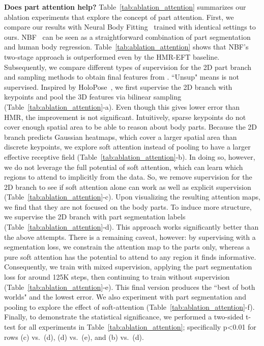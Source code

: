 \documentclass[10pt,twocolumn,letterpaper,usenames,dvipsnames]{article}
\begin{document}
\noindent\textbf{Does part attention help?}
Table~\ref{tab:ablation_attention} summarizes our ablation experiments that explore the concept of part attention. First, we compare our results with Neural Body Fitting~\cite{omran2018nbf} trained with identical settings to ours. NBF~\cite{omran2018nbf} can be seen as a straightforward combination of part segmentation and human body regression. Table~\ref{tab:ablation_attention} shows that NBF's two-stage approach is outperformed even by the HMR-EFT baseline. Subsequently, we compare different types of supervision for the 2D part branch  and sampling methods to obtain final features  from . ``Unsup" means  is not supervised.
Inspired by HoloPose~\cite{guler_2019_CVPR}, we first supervise the 2D branch with keypoints and pool the 3D features via bilinear sampling (Table~\ref{tab:ablation_attention}-a). 
Even though this gives lower error than HMR, the improvement is not significant. 
Intuitively, sparse keypoints do not cover enough spatial area to be able to reason about body parts. 
Because the 2D branch predicts Gaussian heatmaps, which cover a larger spatial area than discrete keypoints, we 
explore soft attention instead of pooling to have a larger effective receptive field (Table~\ref{tab:ablation_attention}-b). 
In doing so, however, we do not leverage the full potential of soft attention, which can learn which regions to attend to implicitly from the data. 
So, we remove supervision for the 2D branch to see if soft attention alone can work as well as explicit supervision (Table~\ref{tab:ablation_attention}-c). 
Upon visualizing the resulting attention maps, we find that they are not focused on the body parts.
To induce more structure, we supervise the 2D branch with part segmentation labels (Table~\ref{tab:ablation_attention}-d). 
This approach works significantly better than the above attempts. 
There is a remaining caveat, however: by supervising with a segmentation loss, we constrain the attention map to the parts only, whereas a pure soft attention has the potential to attend to any region it finds informative. 
Consequently, we train with mixed supervision, applying the part segmentation loss for around 125K steps, then continuing to train without supervision (Table~\ref{tab:ablation_attention}-e). 
This final version produces the ``best of both worlds" and the lowest error. We also experiment with part segmentation and pooling to explore the effect of soft-attention (Table~\ref{tab:ablation_attention}-f). Finally, to demonstrate the statistical significance, we performed a two-sided t-test for all experiments in Table~\ref{tab:ablation_attention}; specifically p\textless0.01 for rows (c) vs.~(d), (d) vs.~(e), and (b) vs.~(d).
\end{document}
